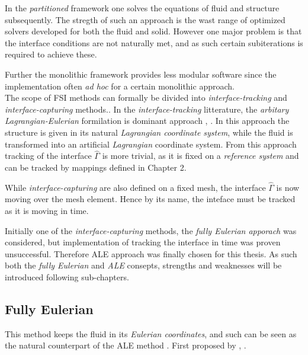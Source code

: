In the \textit{partitioned} framework one solves the equations of fluid and structure subsequently. The stregth of such an approach is the wast range of optimized solvers developed for both the fluid and solid. However one major problem is that the interface conditions are not naturally met, and as such certain subiterations is required to achieve these. 

 Further the monolithic framework provides less modular software since the implementation often \textit{ad hoc} for a certain monolithic approach.  
\\

The scope of FSI methods can formally be divided into \textit{interface-tracking} and \textit{interface-capturing } methods.\cite{Frei2016}. In the \textit{interface-tracking} litterature, the \textit{arbitary Lagrangian-Eulerian} formilation is dominant approach \cite{Richter2010a}, \cite{Frei2016}. In this approach the structure is given in its natural \textit{Lagrangian coordinate system}, while the fluid is transformed into an artificial \textit{Lagrangian} coordinate system. From this approach tracking of the interface $\hat{\Gamma}$ is more trivial, as it is fixed on a \textit{reference system} and can be tracked by mappings defined in Chapter 2. 

While \textit{interface-capturing } are also defined on a fixed mesh, the interface  $\hat{\Gamma}$ is now moving over the mesh element. Hence by its name, the inteface must be tracked as it is moving in time. 

Initially one of the \textit{interface-capturing } methods, the \textit{fully Eulerian apporach } was considered, but implementation of tracking the interface in time was proven unsuccessful. Therefore ALE approach was finally chosen for this thesis. As such both the \textit{fully Eulerian} and \textit{ALE} consepts, strengths and weaknesses will be introduced following sub-chapters. \\

\subsection{Fully Eulerian}
This method keeps the fluid in its \textit{Eulerian coordinates}, and such can be seen as the natural counterpart of the ALE method \cite{Wick2013}. First proposed by , \cite{Dunne2006}.

